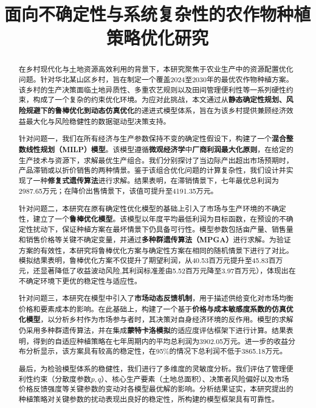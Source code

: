 \documentclass[withoutpreface,bwprint]{cumcmthesis} %
\title{面向不确定性与系统复杂性的农作物种植策略优化研究}
\begin{document}
\maketitle
\begin{abstract}
在乡村现代化与土地资源高效利用的背景下，本研究聚焦于农业生产中的资源配置优化问题。针对华北某山区乡村，旨在制定一个覆盖2024至2030年的最优农作物种植方案。该乡村的生产决策面临土地异质性、多重农艺规则以及田间管理便利性等一系列硬性约束，构成了一个复杂的约束优化环境。为应对此挑战，本文通过从\textbf{静态确定性规划、风险规避下的鲁棒优化到动态仿真优化}的递进式模型体系，旨在为该乡村提供兼顾经济效益最大化与风险稳健性的数据驱动型决策支持。

针对问题一，我们在所有经济与生产参数保持不变的确定性假设下，构建了一个\textbf{混合整数线性规划（MILP）模型}。该模型遵循\textbf{微观经济学}中\textbf{厂商利润最大化原则}，在给定的生产技术与资源下，求解最优生产组合。我们分别探讨了当边际产出超出市场预期时，产品滞销或以折价销售的两种情景。鉴于该组合优化问题的计算复杂性，我们设计并实现了一种\textbf{修复式遗传算法}进行求解。结果表明，在滞销情景下，七年最优总利润为2987.65万元；在降价出售情景下，该值可提升至4191.35万元。


针对问题二，本研究在原有确定性优化模型的基础上引入了市场与生产环境的不确定性，建立了一个\textbf{鲁棒优化模型}。该模型以年度平均最低利润为目标函数，在预设的不确定性扰动下，保证种植方案在最坏情景下仍具备可行性。模型参数包括亩产量、销售量和销售价格等关键不确定变量，并通过\textbf{多种群遗传算法（MPGA）}进行求解。为验证方案的有效性，本研究将鲁棒优化方案与确定性方案在相同的随机情景下进行了对比。模拟结果表明，鲁棒优化方案不仅提升了期望利润，从40.53百万元提升至45.83百万元，还显著降低了收益波动风险,其利润标准差由5.52百万元降至3.97百万元），体现出在不确定环境下更优的稳定性与适应性。


针对问题三，本研究在模型中引入了\textbf{市场动态反馈机制}，用于描述供给变化对市场均衡价格和要素成本的影响。在此基础上，构建了一个基于\textbf{价格与成本敏感度系数的仿真优化模型}，以分析乡村作为市场参与者时，其决策对自身经济环境的反作用。模型的求解仍采用多种群遗传算法，并在集成\textbf{蒙特卡洛模拟}的适应度评估框架下进行计算。结果表明，得到的自适应种植策略在七年周期内的平均总利润为3902.05万元。进一步的收益分布分析显示，该方案具有较高的稳定性，在95\%的情况下总利润不低于3865.18万元。

最后，为检验模型体系的稳健性，我们进行了多维度的灵敏度分析。我们评估了管理便利性约束（分散度参数$p, q$）、核心生产要素（土地总面积）、决策者风险偏好以及市场价格反馈强度等关键参数的变动对各模型最优解的影响。分析结果证实，本研究提出的种植策略对关键参数的扰动表现出良好的稳定性，所构建的模型框架具有可靠性。








\end{abstract}






















\newpage



\newpage
\end{document}
